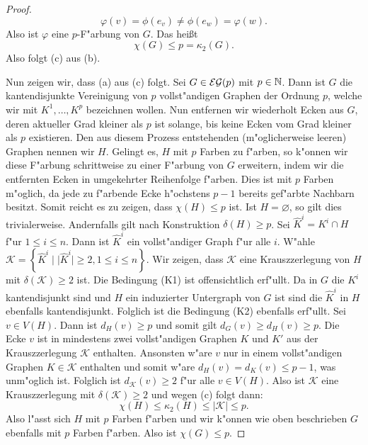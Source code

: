 \begin{proof}
\begin{equation*}
    \varphi(v) = \phi(e_v) \neq \phi(e_w) = \varphi(w).
  \end{equation*} 
  Also ist $\varphi$ eine $p$-F"arbung von $G$. Das hei{\ss}t
  \begin{equation*}
    \chi(G) \leq p = \kappa_{2}(G).
  \end{equation*}
  Also folgt (c) aus (b).

  Nun zeigen wir, dass (a) aus (c) folgt. 
  Sei $G\in {\cal EG}(p) $ mit $p\in {\mathbb{N}}$. Dann ist $G$ die kantendisjunkte Vereinigung von $p$ vollst"andigen Graphen der Ordnung $p$, welche wir mit $K^{1},\dots, K^{p}$ bezeichnen wollen. Nun entfernen wir wiederholt Ecken aus $G$,  deren aktueller Grad kleiner als $p$ ist solange, bis keine Ecken vom Grad kleiner als $p$ existieren. Den aus diesem Prozess entstehenden (m"oglicherweise leeren) Graphen nennen wir $H$. 
  Gelingt es, $H$ mit $p$ Farben zu f"arben, so k"onnen wir diese F"arbung schrittweise zu einer F"arbung von $G$ erweitern, indem wir die entfernten Ecken in umgekehrter Reihenfolge f"arben. Dies ist mit $p$ Farben m"oglich, da jede zu f"arbende Ecke h"ochstens $p-1$ bereits gef"arbte Nachbarn besitzt.
  Somit reicht es zu zeigen, dass $\chi(H) \leq p$ ist. Ist $H =\varnothing$, so gilt dies trivialerweise. Andernfalls gilt nach Konstruktion $\delta(H) \geq p $. 
  Sei $\hat{K}^i = K^{i} \cap H$ f"ur $1\leq i \leq n$. Dann ist $\hat{K}^i$ ein vollst"andiger Graph f"ur alle $i$. W"ahle $\mathcal{K} = \left\{ \hat{K}^i \;|\; | \hat{K}^i| \geq 2  , 1\leq i \leq n\right\}$. Wir zeigen, dass $\mathcal{K}$ eine Krauszzerlegung von $H$ mit $\delta(\mathcal{K}) \geq 2$ ist.
  Die Bedingung (K1) ist offensichtlich erf"ullt. Da in $G$ die $K^{i}$ kantendisjunkt sind und $H$ ein induzierter Untergraph von $G$ ist sind die $\hat{K}^{i}$ in $H$ ebenfalls kantendisjunkt. Folglich ist die Bedingung (K2) ebenfalls erf"ullt. Sei $v\in V(H)$. Dann ist $d_{H}(v) \geq p$ und somit gilt $d_{G}(v) \geq d_H(v) \geq p$. 
  Die Ecke $v$ ist in mindestens zwei vollst"andigen Graphen $K$ und $K'$ aus der Krauszzerlegung $\mathcal{K}$ enthalten. 
  Ansonsten w"are $v$ nur in einem vollst"andigen Graphen $K \in \mathcal{K}$ enthalten und somit w"are $d_{H}(v) = d_{K}(v) \leq p-1$, was unm"oglich ist. 
  Folglich ist $d_{\mathcal{K}}(v) \geq 2$ f"ur alle $v \in V(H)$. Also ist $\mathcal{K}$ eine Krauszzerlegung mit $\delta(\mathcal{K}) \geq 2$ und wegen (c) folgt dann:
  \begin{equation*}
    \chi(H) \leq \kappa_{2}(H) \leq |\mathcal{K}| \leq p .
  \end{equation*}
  Also l"asst sich $H$ mit $p$ Farben f"arben und wir k"onnen wie oben beschrieben $G$ ebenfalls mit $p$ Farben f"arben. Also ist $\chi(G) \leq p$.
\end{proof}


